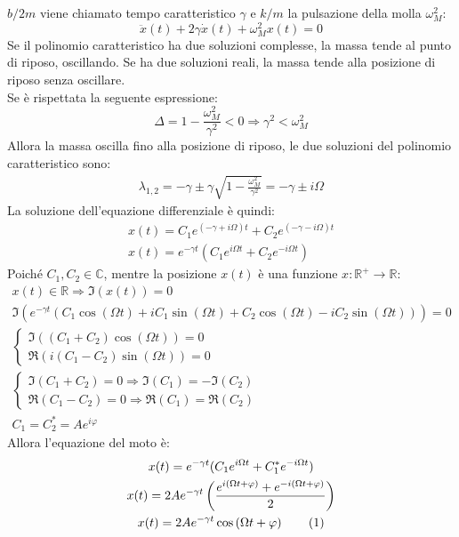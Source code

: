 \documentclass{article}
\numberwithin{equation}{subsection}
\begin{document}
$b/2m$ viene chiamato tempo caratteristico 
$\gamma$ e ${k}/{m}$ 
la pulsazione della molla $\omega_M^{2}$:
\begin{equation}
    \ddot x(t)+2\gamma\dot x(t)+\omega_M^{2}x(t)=0
\end{equation}
Se il polinomio caratteristico ha due soluzioni complesse, 
la massa tende al punto di riposo, oscillando. Se ha 
due soluzioni reali, la massa tende alla posizione di riposo 
senza oscillare.\\
Se è rispettata la seguente espressione:
\begin{equation*}
    \Delta=1-\displaystyle\frac{\omega_M^{2}}{\gamma^{2}} <0\Rightarrow \gamma^{2} < \omega_M^{2}
\end{equation*}
Allora la massa oscilla fino alla posizione di riposo, le due 
soluzioni del polinomio caratteristico sono:
\begin{gather*}
    \lambda_{1,2}=-\gamma\pm\gamma\sqrt{1-\displaystyle\frac{\omega_M^{2}}{\gamma^{2}}}=-\gamma\pm i\Omega
\end{gather*}
La soluzione dell'equazione differenziale è quindi:
\begin{gather*}
    \displaystyle x(t)=C_1e^{\left(-\gamma+ i\Omega\right)t}+C_2e^{\left(-\gamma- i\Omega\right)t}\\
    x(t)=e^{-\gamma t}\left(C_1e^{i\Omega t}+C_2e^{-i\Omega t}\right)
\end{gather*}
Poiché $C_1,C_2\in\mathbb{C}$, mentre la posizione $x(t)$ è una funzione $x:\mathbb{R}^+\to\mathbb{R}$:
\begin{gather*}
    x(t)\in\mathbb{R}\Rightarrow \Im(x(t))=0\\
    \Im\left(e^{-\gamma t}(C_1\cos(\Omega t)+iC_1\sin(\Omega t)+C_2\cos(\Omega t)-iC_2\sin(\Omega t))\right)=0\\
    \begin{cases}
        \Im((C_1+C_2)\cos(\Omega t))=0\\
        \Re(i(C_1-C_2)\sin(\Omega t))=0
    \end{cases}\\ 
    \begin{cases}
        \Im(C_1+C_2)=0\Rightarrow \Im(C_1)=-\Im(C_2)\\
        \Re(C_1-C_2)=0\Rightarrow \Re(C_1)=\Re(C_2)
    \end{cases}\\ 
    C_1=C_2^{*}=Ae^{i\varphi}
\end{gather*}
Allora l'equazione del moto è:
\begin{gather*}
    x(t)=e^{-\gamma t}(C_1e^{i\Omega t}+C_1^*e^{-i\Omega t})\\
    x(t)=2Ae^{-\gamma t}\left(\displaystyle\frac{e^{i(\Omega t+\varphi)}+e^{-i(\Omega t+\varphi)}}{2}\right)\\
    x(t)=2Ae^{-\gamma t}\cos\left(\Omega t +\varphi\right)\tag{\stepcounter{equation}\theequation}
\end{gather*}
\end{document}
